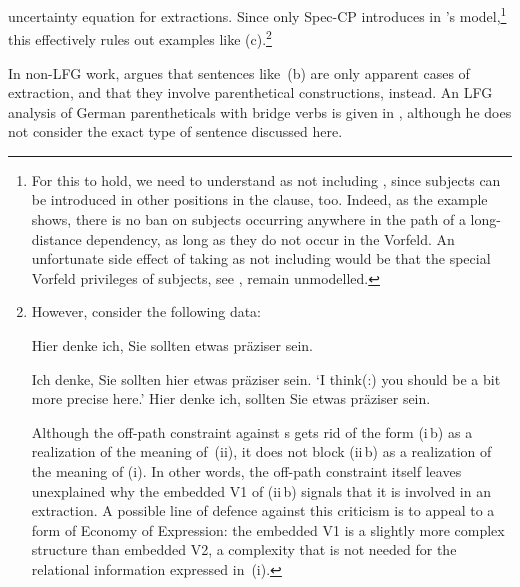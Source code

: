 \documentclass[output=paper,hidelinks]{langscibook}
\begin{document}
uncertainty equation for extractions. Since only Spec-CP introduces \DF{} in \citeauthor{Berman2003}'s model,\footnote{\label{fn:dfnosubj}For this to hold, we need to understand \DF as not
including \SUBJ, since subjects can be introduced in other positions in
the clause, too. Indeed, as the example shows, there is no ban on subjects occurring
anywhere in the path of a long-distance dependency, as long as they do
not occur in the Vorfeld. An unfortunate side effect of taking \DF as not including \SUBJ would be that the special Vorfeld privileges of subjects, see , remain unmodelled.} this effectively rules out examples like (c).\footnote{However, consider the following data:
%
\begin{exe}
  \ex
  \begin{xlist}
  \ex Hier denke ich, Sie sollten etwas präziser sein.

  \end{xlist}
  \ex
  \begin{xlist}
    \ex Ich denke, Sie sollten hier etwas präziser sein.
    \glt   `I think(:) you should be a bit more precise here.'
  \ex Hier denke ich, sollten Sie etwas präziser sein.
  \end{xlist}
\end{exe}
%
Although the off-path constraint against \DF{}s gets rid of the form
(i$\,$b) as a realization of the meaning of~(ii), it does not block
(ii$\,$b) as a realization of the meaning of (i). In other words, the
off-path constraint itself leaves unexplained why the embedded V1 of
(ii$\,$b) signals that it is involved in an extraction. A possible
line of defence against this criticism is to appeal to a form of
Economy of Expression: the embedded V1 is a slightly more complex
structure than embedded V2, a complexity that is not needed for the
relational information expressed in~(i).}

In non-LFG work, \citet{reis:1996} argues that sentences
like~(b) are only apparent cases of extraction, and that they
involve parenthetical constructions, instead. An LFG analysis of
German parentheticals with bridge verbs is given in
\citet{fortmann:2006:lfg}, although he does not consider the exact
type of sentence discussed here.
\end{document}
